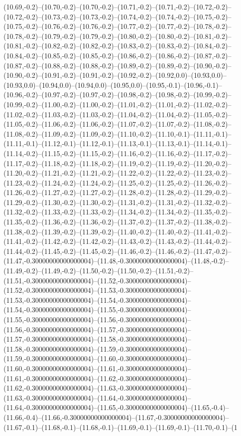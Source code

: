 (10.69,-0.2)--(10.70,-0.2)--(10.70,-0.2)--(10.71,-0.2)--(10.71,-0.2)--(10.72,-0.2)--(10.72,-0.2)--(10.73,-0.2)--(10.73,-0.2)--(10.74,-0.2)--(10.74,-0.2)--(10.75,-0.2)--(10.75,-0.2)--(10.76,-0.2)--(10.76,-0.2)--(10.77,-0.2)--(10.77,-0.2)--(10.78,-0.2)--(10.78,-0.2)--(10.79,-0.2)--(10.79,-0.2)--(10.80,-0.2)--(10.80,-0.2)--(10.81,-0.2)--(10.81,-0.2)--(10.82,-0.2)--(10.82,-0.2)--(10.83,-0.2)--(10.83,-0.2)--(10.84,-0.2)--(10.84,-0.2)--(10.85,-0.2)--(10.85,-0.2)--(10.86,-0.2)--(10.86,-0.2)--(10.87,-0.2)--(10.87,-0.2)--(10.88,-0.2)--(10.88,-0.2)--(10.89,-0.2)--(10.89,-0.2)--(10.90,-0.2)--(10.90,-0.2)--(10.91,-0.2)--(10.91,-0.2)--(10.92,-0.2)--(10.92,0.0)--(10.93,0.0)--(10.93,0.0)--(10.94,0.0)--(10.94,0.0)--(10.95,0.0)--(10.95,-0.1)--(10.96,-0.1)--(10.96,-0.2)--(10.97,-0.2)--(10.97,-0.2)--(10.98,-0.2)--(10.98,-0.2)--(10.99,-0.2)--(10.99,-0.2)--(11.00,-0.2)--(11.00,-0.2)--(11.01,-0.2)--(11.01,-0.2)--(11.02,-0.2)--(11.02,-0.2)--(11.03,-0.2)--(11.03,-0.2)--(11.04,-0.2)--(11.04,-0.2)--(11.05,-0.2)--(11.05,-0.2)--(11.06,-0.2)--(11.06,-0.2)--(11.07,-0.2)--(11.07,-0.2)--(11.08,-0.2)--(11.08,-0.2)--(11.09,-0.2)--(11.09,-0.2)--(11.10,-0.2)--(11.10,-0.1)--(11.11,-0.1)--(11.11,-0.1)--(11.12,-0.1)--(11.12,-0.1)--(11.13,-0.1)--(11.13,-0.1)--(11.14,-0.1)--(11.14,-0.2)--(11.15,-0.2)--(11.15,-0.2)--(11.16,-0.2)--(11.16,-0.2)--(11.17,-0.2)--(11.17,-0.2)--(11.18,-0.2)--(11.18,-0.2)--(11.19,-0.2)--(11.19,-0.2)--(11.20,-0.2)--(11.20,-0.2)--(11.21,-0.2)--(11.21,-0.2)--(11.22,-0.2)--(11.22,-0.2)--(11.23,-0.2)--(11.23,-0.2)--(11.24,-0.2)--(11.24,-0.2)--(11.25,-0.2)--(11.25,-0.2)--(11.26,-0.2)--(11.26,-0.2)--(11.27,-0.2)--(11.27,-0.2)--(11.28,-0.2)--(11.28,-0.2)--(11.29,-0.2)--(11.29,-0.2)--(11.30,-0.2)--(11.30,-0.2)--(11.31,-0.2)--(11.31,-0.2)--(11.32,-0.2)--(11.32,-0.2)--(11.33,-0.2)--(11.33,-0.2)--(11.34,-0.2)--(11.34,-0.2)--(11.35,-0.2)--(11.35,-0.2)--(11.36,-0.2)--(11.36,-0.2)--(11.37,-0.2)--(11.37,-0.2)--(11.38,-0.2)--(11.38,-0.2)--(11.39,-0.2)--(11.39,-0.2)--(11.40,-0.2)--(11.40,-0.2)--(11.41,-0.2)--(11.41,-0.2)--(11.42,-0.2)--(11.42,-0.2)--(11.43,-0.2)--(11.43,-0.2)--(11.44,-0.2)--(11.44,-0.2)--(11.45,-0.2)--(11.45,-0.2)--(11.46,-0.2)--(11.46,-0.2)--(11.47,-0.2)--(11.47,-0.30000000000000004)--(11.48,-0.30000000000000004)--(11.48,-0.2)--(11.49,-0.2)--(11.49,-0.2)--(11.50,-0.2)--(11.50,-0.2)--(11.51,-0.2)--(11.51,-0.30000000000000004)--(11.52,-0.30000000000000004)--(11.52,-0.30000000000000004)--(11.53,-0.30000000000000004)--(11.53,-0.30000000000000004)--(11.54,-0.30000000000000004)--(11.54,-0.30000000000000004)--(11.55,-0.30000000000000004)--(11.55,-0.30000000000000004)--(11.56,-0.30000000000000004)--(11.56,-0.30000000000000004)--(11.57,-0.30000000000000004)--(11.57,-0.30000000000000004)--(11.58,-0.30000000000000004)--(11.58,-0.30000000000000004)--(11.59,-0.30000000000000004)--(11.59,-0.30000000000000004)--(11.60,-0.30000000000000004)--(11.60,-0.30000000000000004)--(11.61,-0.30000000000000004)--(11.61,-0.30000000000000004)--(11.62,-0.30000000000000004)--(11.62,-0.30000000000000004)--(11.63,-0.30000000000000004)--(11.63,-0.30000000000000004)--(11.64,-0.30000000000000004)--(11.64,-0.30000000000000004)--(11.65,-0.30000000000000004)--(11.65,-0.4)--(11.66,-0.4)--(11.66,-0.30000000000000004)--(11.67,-0.30000000000000004)--(11.67,-0.1)--(11.68,-0.1)--(11.68,-0.1)--(11.69,-0.1)--(11.69,-0.1)--(11.70,-0.1)--(1
